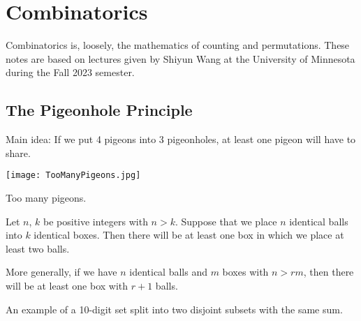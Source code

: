 \chapter{Combinatorics}

Combinatorics is, loosely, the mathematics of counting and 
permutations. These notes are based on lectures given by Shiyun 
Wang at the University of Minnesota during the Fall 2023 semester.


\newpage

\section{The Pigeonhole Principle}

Main idea: If we put 4 pigeons into 3 pigeonholes, at least one 
pigeon will have to share.

\begin{marginfigure}[.2in]
	\texttt{[image: TooManyPigeons.jpg]}
	\caption{Too many pigeons.}
\end{marginfigure}

\begin{definition}
	Let $n$, $k$ be positive integers with $n > k$. Suppose that we 
	place $n$ identical balls into $k$ identical boxes. Then there 
	will be at least one box in which we place at least two balls.
	
	More generally, if we have $n$ identical balls and $m$ boxes 
	with $n > rm$, then there will be at least one box with $r + 1$ 
	balls.
\end{definition}

\begin{marginfigure}[.4in]
	\centering
	\caption{An example of a 10-digit set split into two disjoint 
		subsets with the same sum.}\label{pigeon}
\end{marginfigure}

